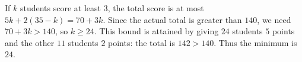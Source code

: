 If $k$ students score at least $3$, the total score is at most $5k+2(35-k)=70+3k$. Since the actual total is greater than $140$, we need $70+3k>140$, so $k\ge24$. This bound is attained by giving $24$ students $5$ points and the other $11$ students $2$ points: the total is $142>140$. Thus the minimum is $\boxed{24}$.
